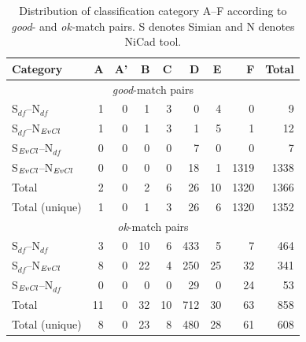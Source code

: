 \documentclass{sig-alternate-05-2015}
\begin{document}
\begin{table}
	\centering
	\caption{Distribution of classification category A--F according to \textit{good}- and \textit{ok-}match pairs. S denotes Simian and N denotes NiCad tool.}
	\label{tab:good_classification}
	\small
	\begin{tabular}{|l|r|r|r|r|r|r|r|r|}
		\hline 
		Category   & A   & 	A'   & 	B   & C   & D   &	E   &	F   & Total  \\
		\hline
		\hline
		\multicolumn{9}{|c|}{\textit{good}-match pairs} \\
		\hline
		S$_{df}$--N$_{df}$   & 1 & 0 & 1 & 3 & 0 & 4 & 0 & 9 \\
		S$_{df}$--N$_{\textrm{\textit{EvCl}}}$   & 1 & 0 & 1 & 3 & 1 & 5 & 1 & 12 \\
		S$_{\textrm{\textit{EvCl}}}$--N$_{df}$   & 0 & 0 & 0 & 0 & 7 & 0 & 0 & 7 \\
		S$_{\textrm{\textit{EvCl}}}$--N$_{\textrm{\textit{EvCl}}}$   & 0 & 0 & 0 & 0 & 18 & 1 & 1319 & 1338 \\
		\hline
		Total   &   2   &   0   &  2   &  6   &   26   &   10   & 1320  & 1366 \\
		Total (unique)  &   1   &   0   &  1   &  3   &   26   &   6   & 1320  & 1352 \\
		\hline
		\hline 
		\multicolumn{9}{|c|}{\textit{ok}-match pairs} \\
		\hline
		S$_{df}$--N$_{df}$        & 3 	& 0 	& 10	& 6 	& 433  & 5	& 7  &  464 \\
		S$_{df}$--N$_{\textrm{\textit{EvCl}}}$   	& 8 	& 0 	& 22	& 4	& 250 & 25  & 32 &  341 \\
		S$_{\textrm{\textit{EvCl}}}$--N$_{df}$   	& 0 	& 0 	& 0 	& 0 	 & 29 	  & 0 		& 24 	& 53 \\
		\hline
		Total   &   11  &   0   &  32   &  10   &   712   &   30   & 63  & 858 \\
		Total (unique)  &   8  &   0   &  23   &  8   &  480  &  28  & 61  & 608 \\
		\hline
	\end{tabular} 
\end{table}
\end{document}
